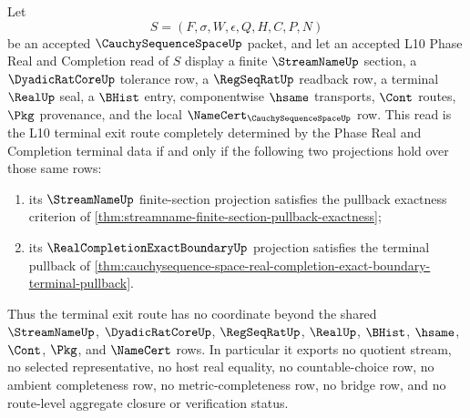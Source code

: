 \begin{theorem}
\label{thm:cauchysequence-space-terminal-pullback-exactness}
Let
$$
S=(F,\sigma,W,\epsilon,Q,H,C,P,N)
$$
be an accepted $\CauchySequenceSpaceUp$ packet, and let an accepted L10 Phase Real and Completion read of $S$ display a finite $\StreamNameUp$ section, a $\DyadicRatCoreUp$ tolerance row, a $\RegSeqRatUp$ readback row, a terminal $\RealUp$ seal, a $\BHist$ entry, componentwise $\hsame$ transports, $\Cont$ routes, $\Pkg$ provenance, and the local $\NameCert_{\CauchySequenceSpaceUp}$ row. This read is the L10 terminal exit route completely determined by the Phase Real and Completion terminal data if and only if the following two projections hold over those same rows:
\begin{enumerate}
\item its $\StreamNameUp$ finite-section projection satisfies the pullback exactness criterion of \autoref{thm:streamname-finite-section-pullback-exactness};
\item its $\RealCompletionExactBoundaryUp$ projection satisfies the terminal pullback of \autoref{thm:cauchysequence-space-real-completion-exact-boundary-terminal-pullback}.
\end{enumerate}

Thus the terminal exit route has no coordinate beyond the shared $\StreamNameUp$, $\DyadicRatCoreUp$, $\RegSeqRatUp$, $\RealUp$, $\BHist$, $\hsame$, $\Cont$, $\Pkg$, and $\NameCert$ rows. In particular it exports no quotient stream, no selected representative, no host real equality, no countable-choice row, no ambient completeness row, no metric-completeness row, no bridge row, and no route-level aggregate closure or verification status.
\end{theorem}
